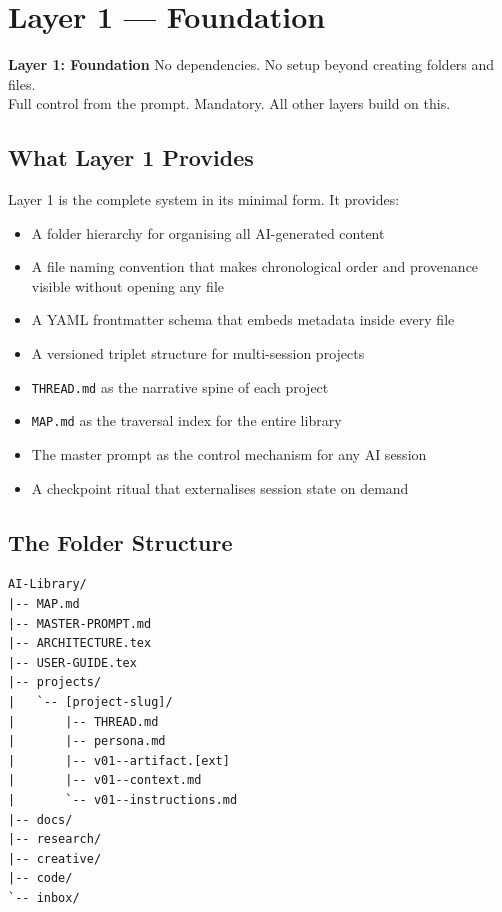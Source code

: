 \documentclass[12pt,letterpaper]{article}
\begin{document}
\section{Layer 1 --- Foundation}

\begin{layerbox1}
\textbf{Layer 1: Foundation} \quad No dependencies. No setup beyond creating folders and files.\\
Full control from the prompt. Mandatory. All other layers build on this.
\end{layerbox1}

\subsection{What Layer 1 Provides}

Layer 1 is the complete system in its minimal form. It provides:

\begin{itemize}
  \item A folder hierarchy for organising all AI-generated content
  \item A file naming convention that makes chronological order and
        provenance visible without opening any file
  \item A YAML frontmatter schema that embeds metadata inside every file
  \item A versioned triplet structure for multi-session projects
  \item \texttt{THREAD.md} as the narrative spine of each project
  \item \texttt{MAP.md} as the traversal index for the entire library
  \item The master prompt as the control mechanism for any AI session
  \item A checkpoint ritual that externalises session state on demand
\end{itemize}

\subsection{The Folder Structure}

\begin{lstlisting}
AI-Library/
|-- MAP.md
|-- MASTER-PROMPT.md
|-- ARCHITECTURE.tex
|-- USER-GUIDE.tex
|-- projects/
|   `-- [project-slug]/
|       |-- THREAD.md
|       |-- persona.md
|       |-- v01--artifact.[ext]
|       |-- v01--context.md
|       `-- v01--instructions.md
|-- docs/
|-- research/
|-- creative/
|-- code/
`-- inbox/
\end{lstlisting}
\end{document}
